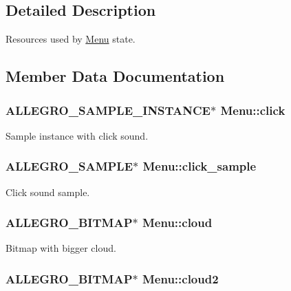 \begin{DoxyCompactItemize}
\begin{tabbing}
\end{tabbing}\end{DoxyCompactItemize}


\subsection{\-Detailed \-Description}
\-Resources used by \hyperlink{structMenu}{\-Menu} state. 

\subsection{\-Member \-Data \-Documentation}
\hypertarget{structMenu_a8f8e8b511a64f03e71259dde1a7bf6f2}{
\subsubsection[{click}]{\setlength{\rightskip}{0pt plus 5cm}\-A\-L\-L\-E\-G\-R\-O\-\_\-\-S\-A\-M\-P\-L\-E\-\_\-\-I\-N\-S\-T\-A\-N\-C\-E$\ast$ {\bf \-Menu\-::click}}}\label{structMenu_a8f8e8b511a64f03e71259dde1a7bf6f2}
\-Sample instance with click sound. \hypertarget{structMenu_a012f284df5f9d8e39785a264c736c506}{
\subsubsection[{click\-\_\-sample}]{\setlength{\rightskip}{0pt plus 5cm}\-A\-L\-L\-E\-G\-R\-O\-\_\-\-S\-A\-M\-P\-L\-E$\ast$ {\bf \-Menu\-::click\-\_\-sample}}}\label{structMenu_a012f284df5f9d8e39785a264c736c506}
\-Click sound sample. \hypertarget{structMenu_a9abb4b7b9f726884aa378e746857b6f2}{
\subsubsection[{cloud}]{\setlength{\rightskip}{0pt plus 5cm}\-A\-L\-L\-E\-G\-R\-O\-\_\-\-B\-I\-T\-M\-A\-P$\ast$ {\bf \-Menu\-::cloud}}}\label{structMenu_a9abb4b7b9f726884aa378e746857b6f2}
\-Bitmap with bigger cloud. \hypertarget{structMenu_a6ee03b8791791ecca4f9a3b9fb1851c1}{
\subsubsection[{cloud2}]{\setlength{\rightskip}{0pt plus 5cm}\-A\-L\-L\-E\-G\-R\-O\-\_\-\-B\-I\-T\-M\-A\-P$\ast$ {\bf \-Menu\-::cloud2}}}\label{structMenu_a6ee03b8791791ecca4f9a3b9fb1851c1}

